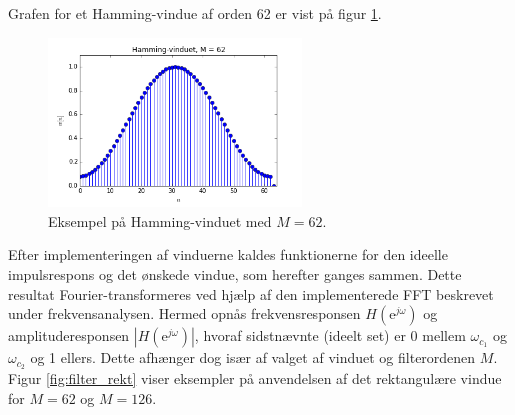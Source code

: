 Grafen for et Hamming-vindue af orden 62 er vist på figur \ref{fig:Hamming}.
\begin{figure}[H]
    \centering
    \includegraphics[width = 0.6\textwidth]{figures/Filter/Hamming_62.PNG}
    \caption{Eksempel på Hamming-vinduet med $M = 62$.}
    \label{fig:Hamming}
\end{figure}

Efter implementeringen af vinduerne kaldes funktionerne for den ideelle impulsrespons og det ønskede vindue, som herefter ganges sammen. Dette resultat Fourier-transformeres ved hjælp af den implementerede FFT beskrevet under frekvensanalysen. Hermed opnås frekvensresponsen $H(\text{e}^{j\omega})$ og amplituderesponsen $|H(\text{e}^{j\omega})|$, hvoraf sidstnævnte (ideelt set) er 0 mellem $\omega_{c_1}$ og $\omega_{c_2}$ og 1 ellers. Dette afhænger dog især af valget af vinduet og filterordenen $M$. Figur \ref{fig:filter_rekt} viser eksempler på anvendelsen af det rektangulære vindue for $M = 62$ og $M = 126$.

